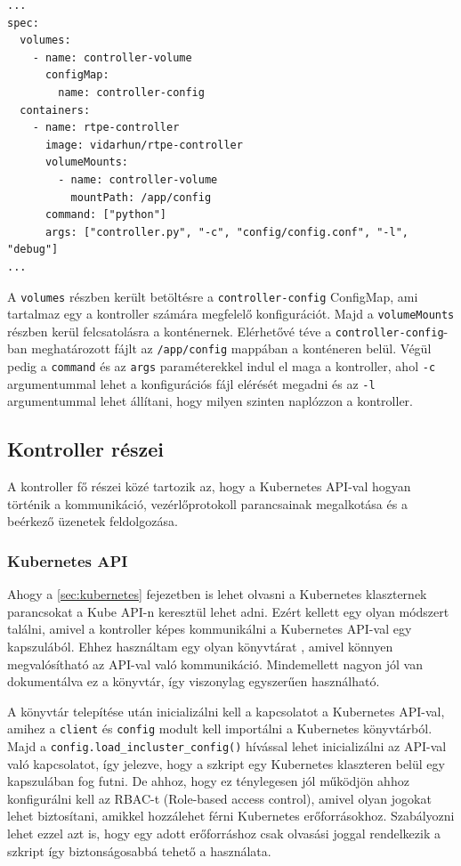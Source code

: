 \begin{lstlisting}[caption=Kubernetes konténer specifikációja, label=lst:kubeSpec]
...
spec:
  volumes:
    - name: controller-volume
      configMap:
        name: controller-config
  containers:
    - name: rtpe-controller
      image: vidarhun/rtpe-controller
      volumeMounts:
        - name: controller-volume
          mountPath: /app/config
      command: ["python"]
      args: ["controller.py", "-c", "config/config.conf", "-l", "debug"]
...
\end{lstlisting}

A \texttt{volumes} részben került betöltésre a \texttt{controller-config} ConfigMap, ami 
tartalmaz egy a kontroller számára megfelelő konfigurációt. Majd a 
\texttt{volumeMounts} részben kerül felcsatolásra a konténernek. Elérhetővé téve a 
\texttt{controller-config}-ban meghatározott fájlt az \texttt{/app/config} mappában a 
konténeren belül. Végül pedig a \texttt{command} és az \texttt{args} paraméterekkel indul 
el maga a kontroller, ahol \texttt{-c} argumentummal lehet a konfigurációs fájl elérését 
megadni és az \texttt{-l} argumentummal lehet állítani, hogy milyen szinten naplózzon a 
kontroller.

\subsection{Kontroller részei}

A kontroller fő részei közé tartozik az, hogy a Kubernetes API-val 
hogyan történik a kommunikáció, vezérlőprotokoll parancsainak megalkotása és
a beérkező üzenetek feldolgozása. 

\subsubsection{Kubernetes API}

Ahogy a \ref{sec:kubernetes} fejezetben is lehet olvasni a Kubernetes
klaszternek parancsokat a Kube API-n keresztül lehet adni. Ezért kellett egy olyan
módszert találni, amivel a kontroller képes kommunikálni a Kubernetes API-val 
egy kapszulából. Ehhez használtam egy olyan könyvtárat \cite{pythonKubeAPI}, amivel
könnyen megvalósítható az API-val való kommunikáció. Mindemellett nagyon jól
van dokumentálva ez a könyvtár, így viszonylag egyszerűen használható.

A könyvtár telepítése után inicializálni kell a kapcsolatot a Kubernetes 
API-val, amihez a \texttt{client} és \texttt{config} modult kell importálni
a Kubernetes könyvtárból. Majd a \texttt{config.load\_incluster\_config()}
hívással lehet inicializálni az API-val való kapcsolatot, így jelezve, hogy a
szkript egy Kubernetes klaszteren belül egy kapszulában fog futni. De ahhoz, hogy ez 
ténylegesen jól működjön ahhoz konfigurálni kell az RBAC-t (Role-based access control), 
amivel olyan jogokat lehet biztosítani, amikkel hozzálehet férni Kubernetes  
erőforrásokhoz. Szabályozni lehet ezzel azt is, hogy egy adott erőforráshoz  csak 
olvasási joggal rendelkezik a szkript így biztonságosabbá tehető a használata.

